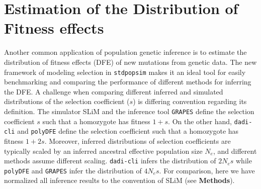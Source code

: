 \documentclass[hidelinks]{article}
\newcommand{\stdpopsim}{\texttt{stdpopsim}\xspace}
\newcommand{\polydfe}{\texttt{polyDFE}\xspace}
\newcommand{\dadicli}{\texttt{dadi-cli}\xspace}
\newcommand{\grapes}{\texttt{GRAPES}\xspace}
\begin{document}
\section*{Estimation of the Distribution of Fitness effects}
    \label{dfe}
    Another common application of population genetic inference is to estimate the distribution of fitness effects (DFE) of new mutations
    from genetic data. The new framework of modeling selection in \stdpopsim makes it an ideal tool for easily benchmarking and comparing
    the performance of different methods for inferring the DFE. 
    A challenge when comparing different inferred and simulated distributions of the selection coefficient ($s$) is differing convention regarding its definition.
    The simulator SLiM and the inference tool \grapes define the selection coefficient $s$ such that a homozygote has fitness $1+s$.
    On the other hand, \dadicli and \polydfe define the selection coefficient such that a homozygote has fitness $1+ 2s$.
    Moreover, inferred distributions of selection coefficients are typically scaled by an inferred ancestral
    effective population size $N_e$, and different methods assume different scaling.
    \dadicli infers the distribution of $2 N_e s$ while \polydfe and \grapes infer the distribution of $4 N_e s$.
    For comparison, here we have normalized all inference results to the convention of SLiM (see \textbf{Methods}).
\end{document}
